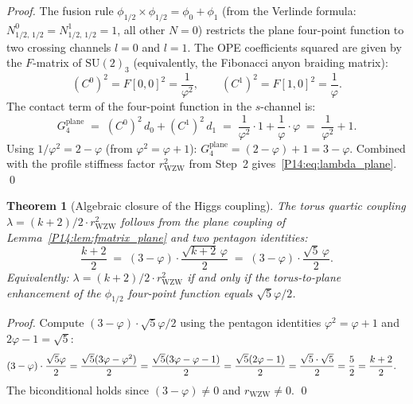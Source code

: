 \documentclass[11pt,a4paper]{article}
\newtheorem{theorem}{Theorem}[section]
\theoremstyle{definition}
\theoremstyle{remark}
\newcommand{\vp}{\varphi}
\begin{document}
\begin{proof}
The fusion rule $\phi_{1/2}\times\phi_{1/2} = \phi_0 + \phi_1$
(from the Verlinde formula: $N_{1/2,\,1/2}^0 = N_{1/2,\,1/2}^1 = 1$,
all other $N=0$) restricts the plane four-point function to two
crossing channels $l=0$ and $l=1$.
The OPE coefficients squared are given by the $F$-matrix of
$\mathrm{SU}(2)_3$ (equivalently, the Fibonacci anyon braiding matrix):
\begin{equation}
  (C^0)^2 = F[0,0]^2 = \frac{1}{\vp^2},
  \qquad
  (C^1)^2 = F[1,0]^2 = \frac{1}{\vp}.
  \label{P14:eq:Csq_fmatrix}
\end{equation}
The contact term of the four-point function in the $s$-channel is:
\begin{equation}
  G_4^{\mathrm{plane}} \;=\; (C^0)^2\,d_0 + (C^1)^2\,d_1
  \;=\; \frac{1}{\vp^2}\cdot1 + \frac{1}{\vp}\cdot\vp
  \;=\; \frac{1}{\vp^2}+1.
\end{equation}
Using $1/\vp^2 = 2-\vp$ (from $\vp^2=\vp+1$):
$G_4^{\mathrm{plane}} = (2-\vp)+1 = 3-\vp$.
Combined with the profile stiffness factor $r_{\mathrm{WZW}}^2$
from Step~2 gives~\eqref{P14:eq:lambda_plane}.
\qed
\end{proof}

\begin{theorem}[Algebraic closure of the Higgs coupling]
\label{P14:thm:higgs_algebra}
The torus quartic coupling $\lambda=(k+2)/2\cdot r_{\mathrm{WZW}}^2$
follows from the plane coupling of Lemma~\ref{P14:lem:fmatrix_plane}
and two pentagon identities:
\begin{equation}
  \boxed{\frac{k+2}{2}
  \;=\; (3-\vp)\cdot\frac{\sqrt{k+2}\,\vp}{2}
  \;=\; (3-\vp)\cdot\frac{\sqrt{5}\,\vp}{2}.}
  \label{P14:eq:higgs_closure}
\end{equation}
Equivalently: $\lambda = (k+2)/2\cdot r_{\mathrm{WZW}}^2$ if and only if
the torus-to-plane enhancement of the $\phi_{1/2}$ four-point function
equals $\sqrt{5}\vp/2$.
\end{theorem}

\begin{proof}
Compute $(3-\vp)\cdot\sqrt{5}\vp/2$ using the pentagon identities
$\vp^2=\vp+1$ and $2\vp-1=\sqrt{5}$:
\begin{align}
  (3-\vp)\cdot\frac{\sqrt{5}\vp}{2}
  &= \frac{\sqrt{5}(3\vp-\vp^2)}{2}
  = \frac{\sqrt{5}(3\vp-\vp-1)}{2}
  = \frac{\sqrt{5}(2\vp-1)}{2}
  = \frac{\sqrt{5}\cdot\sqrt{5}}{2}
  = \frac{5}{2}
  = \frac{k+2}{2}.
  \notag
\end{align}
The biconditional holds since $(3-\vp)\neq0$ and $r_{\mathrm{WZW}}\neq0$.
\qed
\end{proof}
\end{document}
